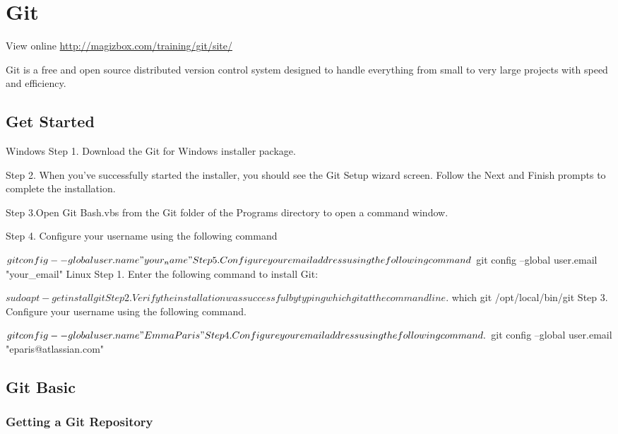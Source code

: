 \chapter{Git}

View online \href{http://magizbox.com/training/git/site/}{http://magizbox.com/training/git/site/}

Git is a free and open source distributed version control system designed to handle everything from small to very large projects with speed and efficiency.

\section{Get Started}

Windows
Step 1. Download the Git for Windows installer package.

Step 2. When you've successfully started the installer, you should see the Git Setup wizard screen. Follow the Next and Finish prompts to complete the installation.



Step 3.Open Git Bash.vbs from the Git folder of the Programs directory to open a command window.



Step 4. Configure your username using the following command

$ git config --global user.name "your_name"
Step 5. Configure your email address using the following command

$ git config --global user.email "your_email"
Linux
Step 1. Enter the following command to install Git:

$ sudo apt-get install git
Step 2. Verify the installation was successful by typing which git at the command line.

$ which git
/opt/local/bin/git
Step 3. Configure your username using the following command.

$ git config --global user.name "Emma Paris"
Step 4. Configure your email address using the following command.

$ git config --global user.email "eparis@atlassian.com"

\section{Git Basic}

\subsection{Getting a Git Repository}

